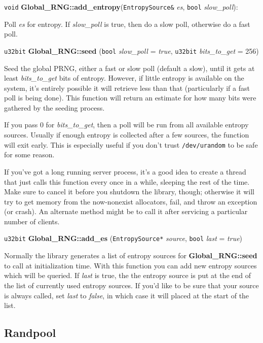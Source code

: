 \documentclass{article}
\newcommand{\filename}[1]{\texttt{#1}}
\newcommand{\function}[1]{\textbf{#1}}
\newcommand{\type}[1]{\texttt{#1}}
\renewcommand{\arg}[1]{\textsl{#1}}
\begin{document}
\vskip 5pt
\noindent
\type{void} \function{Global\_RNG::add\_entropy}(\type{EntropySource\&}
                        \arg{es}, \type{bool} \arg{slow\_poll}):

Poll \arg{es} for entropy. If \arg{slow\_poll} is true, then do a slow poll,
otherwise do a fast poll.

\vskip 5pt
\noindent
\type{u32bit} \function{Global\_RNG::seed}
(\type{bool} \arg{slow\_poll} = \arg{true},
 \type{u32bit} \arg{bits\_to\_get} = 256)

Seed the global PRNG, either a fast or slow poll (default a slow), until it
gets at least \arg{bits\_to\_get} bits of entropy. However, if little entropy
is available on the system, it's entirely possible it will retrieve less than
that (particularly if a fast poll is being done). This function will return an
estimate for how many bits were gathered by the seeding process.

If you pass 0 for \arg{bits\_to\_get}, then a poll will be run from all
available entropy sources. Usually if enough entropy is collected after a few
sources, the function will exit early. This is especially useful if you don't
trust \filename{/dev/urandom} to be safe for some reason.

If you've got a long running server process, it's a good idea to create a
thread that just calls this function every once in a while, sleeping the rest
of the time. Make sure to cancel it before you shutdown the library, though;
otherwise it will try to get memory from the now-nonexist allocators, fail, and
throw an exception (or crash). An alternate method might be to call it after
servicing a particular number of clients.

\vskip 5pt
\noindent
\type{u32bit} \function{Global\_RNG::add\_es}
(\type{EntropySource*} \arg{source}, \type{bool} \arg{last} = \arg{true})

Normally the library generates a list of entropy sources for
\function{Global\_RNG::seed} to call at initialization time. With this function
you can add new entropy sources which will be queried. If \arg{last} is true,
the the entropy source is put at the end of the list of currently used entropy
sources. If you'd like to be sure that your source is always called, set
\arg{last} to \arg{false}, in which case it will placed at the start of the
list.

\subsection{Randpool}
\end{document}
